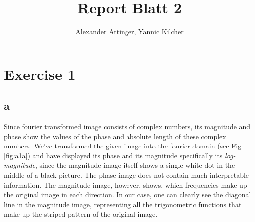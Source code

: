 \documentclass[11pt,a4paper]{article}
\author{Alexander Attinger, Yannic Kilcher}
\title{Report Blatt 2}
\begin{document}
\maketitle
\section{Exercise 1}
\subsection{a}
Since fourier transformed image consists of complex numbers, its magnitude and phase show the values of the phase and absolute length of these complex numbers. We've transformed the given image into the fourier domain (see Fig.\ref{fig:a1a}) and have displayed its phase and its magnitude specifically its \emph{log-magnitude}, since the magnitude image itself shows a single white dot in the middle of a black picture.
The phase image does not contain much interpretable information. The magnitude image, however, shows, which frequencies make up the original image in each direction. In our case, one can clearly see the diagonal line in the magnitude image, representing all the trigonometric functions that make up the striped pattern of the original image.
\end{document}
